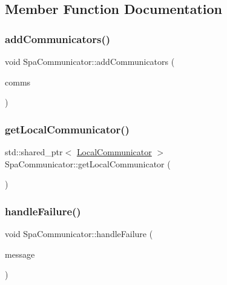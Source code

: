 \subsection{Member Function Documentation}
\mbox{\label{classSpaCommunicator_a310ae62534090d112e8c3b2d024db83f}} 
\subsubsection{\texorpdfstring{add\+Communicators()}{addCommunicators()}}
{\footnotesize\ttfamily void Spa\+Communicator\+::add\+Communicators (\begin{DoxyParamCaption}\item[{std\+::vector$<$ std\+::shared\+\_\+ptr$<$ \hyperlink{classPhysicalCommunicator}{Physical\+Communicator} $>$$>$}]{comms }\end{DoxyParamCaption})}

\mbox{\label{classSpaCommunicator_adcd23698bae79308a28709c60288680e}} 
\subsubsection{\texorpdfstring{get\+Local\+Communicator()}{getLocalCommunicator()}}
{\footnotesize\ttfamily std\+::shared\+\_\+ptr$<$ \hyperlink{classLocalCommunicator}{Local\+Communicator} $>$ Spa\+Communicator\+::get\+Local\+Communicator (\begin{DoxyParamCaption}{ }\end{DoxyParamCaption})}

\mbox{\label{classSpaCommunicator_aeacd2e5d7178f34cec7701136a6821e7}} 
\subsubsection{\texorpdfstring{handle\+Failure()}{handleFailure()}}
{\footnotesize\ttfamily void Spa\+Communicator\+::handle\+Failure (\begin{DoxyParamCaption}\item[{std\+::string}]{message }\end{DoxyParamCaption})\hspace{0.3cm}{\ttfamily [protected]}}



